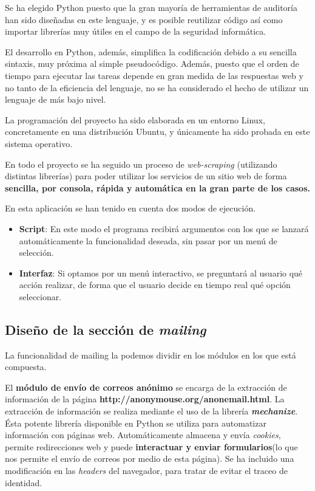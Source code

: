 Se ha elegido Python puesto que la gran mayoría de herramientas de auditoría han sido diseñadas en este lenguaje, y es posible reutilizar código así como importar librerías muy útiles en el campo de la seguridad informática.

El desarrollo en Python, además, simplifica la codificación debido a su sencilla sintaxis, muy próxima al simple pseudocódigo. Además, puesto que el orden de tiempo para ejecutar las tareas depende en gran medida de las respuestas web y no tanto de la eficiencia del lenguaje, no se ha considerado el hecho de utilizar un lenguaje de más bajo nivel.

La programación del proyecto ha sido elaborada en un entorno Linux, concretamente en una distribución Ubuntu, y únicamente ha sido probada en este sistema operativo.

En todo el proyecto se ha seguido un proceso de \textit{web-scraping} (utilizando distintas librerías) para poder utilizar los servicios de un sitio web de forma \textbf{sencilla, por consola, rápida y automática en la gran parte de los casos.}

En esta aplicación se han tenido en cuenta dos modos de ejecución. 

\begin{itemize}
	\item \textbf{Script}: En este modo el programa recibirá argumentos con los que se lanzará automáticamente la funcionalidad deseada, sin pasar por un menú de selección.
	\item \textbf{Interfaz}: Si optamos por un menú interactivo, se preguntará al usuario qué acción realizar, de forma que el usuario decide en tiempo real qué opción seleccionar.
\end{itemize}

\subsection{Diseño de la sección de \textit{mailing}}

La funcionalidad de mailing la podemos dividir en los módulos en los que está compuesta. 

El \textbf{módulo de envío de correos anónimo} se encarga de la extracción de información de la página \textbf{http://anonymouse.org/anonemail.html}. La extracción de información se realiza mediante el uso de la librería \textbf{\textit{mechanize}}. Ésta potente librería disponible en Python se utiliza para automatizar información con páginas web. Automáticamente almacena y envía \textit{cookies}, permite redirecciones web y puede \textbf{interactuar y enviar formularios}(lo que nos permite el envío de correos por medio de esta página).
Se ha incluido una modificación en las \textit{headers} del navegador, para tratar de evitar el traceo de identidad.

